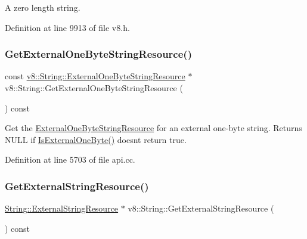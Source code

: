 A zero length string. 

Definition at line 9913 of file v8.\+h.

\mbox{\label{classv8_1_1String_af362afb9835e123ad28c5255964af793}} 
\subsubsection{\texorpdfstring{Get\+External\+One\+Byte\+String\+Resource()}{GetExternalOneByteStringResource()}}
{\footnotesize\ttfamily const \mbox{\hyperlink{classv8_1_1String_1_1ExternalOneByteStringResource}{v8\+::\+String\+::\+External\+One\+Byte\+String\+Resource}} $\ast$ v8\+::\+String\+::\+Get\+External\+One\+Byte\+String\+Resource (\begin{DoxyParamCaption}{ }\end{DoxyParamCaption}) const}

Get the \mbox{\hyperlink{classv8_1_1String_1_1ExternalOneByteStringResource}{External\+One\+Byte\+String\+Resource}} for an external one-\/byte string. Returns N\+U\+LL if \mbox{\hyperlink{classv8_1_1String_a29b5d1786d906b84e10a5cab9451f976}{Is\+External\+One\+Byte()}} doesn\textquotesingle{}t return true. 

Definition at line 5703 of file api.\+cc.

\mbox{\label{classv8_1_1String_ac751c8c239eb213a879204cab6787883}} 
\subsubsection{\texorpdfstring{Get\+External\+String\+Resource()}{GetExternalStringResource()}}
{\footnotesize\ttfamily \mbox{\hyperlink{classv8_1_1String_1_1ExternalStringResource}{String\+::\+External\+String\+Resource}} $\ast$ v8\+::\+String\+::\+Get\+External\+String\+Resource (\begin{DoxyParamCaption}{ }\end{DoxyParamCaption}) const}

